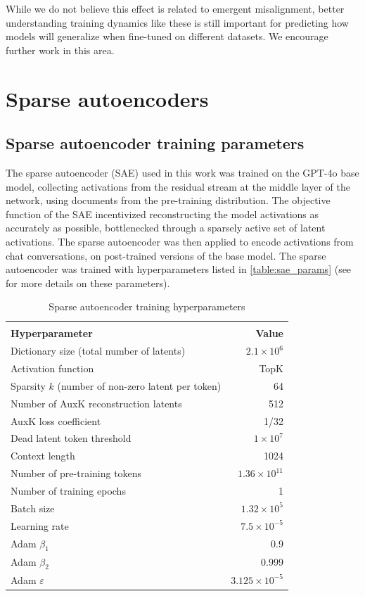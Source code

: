  While we do not believe this effect is related to emergent misalignment, better understanding training dynamics like these is still important for predicting how models will generalize when fine-tuned on different datasets. We encourage further work in this area.

\newpage
\section{Sparse autoencoders}
\subsection{Sparse autoencoder training parameters}
\label{app:sae_params}
The sparse autoencoder (SAE) used in this work was trained on the GPT-4o base model, collecting activations from the residual stream at the middle layer of the network, using documents from the pre-training distribution. The objective function of the SAE incentivized reconstructing the model activations as accurately as possible, bottlenecked through a sparsely active set of latent activations. The sparse autoencoder was then applied to encode activations from chat conversations, on post-trained versions of the base model.
The sparse autoencoder was trained with hyperparameters listed in \autoref{table:sae_params} (see \citet{gao2024scalingevaluatingsparseautoencoders} for more
details on these parameters).

\begin{table}[htbp]
    \renewcommand{\arraystretch}{1.1} %
    \small
    \centering
    \begin{tabular}{lr}
    \hline
    \\[-0.7em] %
    \textbf{Hyperparameter} & \textbf{Value} \\
    [0.3em] %
    \hline
    Dictionary size (total number of latents) & $2.1 \times 10^{6}$ \\
    Activation function & TopK \\
    Sparsity $k$ (number of non-zero latent per token) & 64 \\
    Number of AuxK reconstruction latents & 512 \\
    AuxK loss coefficient & 1/32 \\
    Dead latent token threshold & $1 \times 10^{7}$ \\
    Context length & 1024 \\
    Number of pre-training tokens & $1.36 \times 10^{11}$ \\
    Number of training epochs & 1 \\
    Batch size & $1.32 \times 10^{5}$ \\
    Learning rate & $7.5 \times 10^{-5}$ \\
    Adam $\beta_1$ & 0.9 \\
    Adam $\beta_2$ & 0.999 \\
    Adam $\varepsilon$ & $3.125 \times 10^{-5}$ \\
    \hline
    \end{tabular}
    \caption{Sparse autoencoder training hyperparameters}
    \label{table:sae_params}
\end{table}
